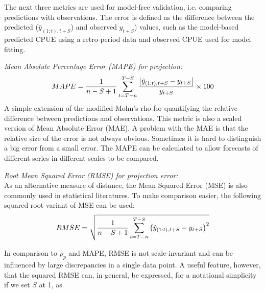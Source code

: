 
\vspace{0.2cm} 
The next three metrics are used for model-free validation, i.e. comparing predictions with observations. The error is defined as the difference between the predicted ($\hat{y}_{(1:t),t+S}$) and observed $y_{t+S}$) values, such as the model-based predicted CPUE using a retro-period data and observed CPUE used for model fitting. 

\vspace{0.2cm} \noindent
{\it Mean Absolute Percentage Error (MAPE) for projection:}
\begin{equation}
\label{eqn:mape}
MAPE = \displaystyle \frac{1}{n-S+1} \sum_{t=T-n}^{T-S}
\frac{\left| \hat{y}_{(1:t),t+S}-y_{t+S} \right|}{y_{t+S}} \times 100 
\end{equation} 
A simple extension of the modified Mohn's rho for quantifying the relative difference between predictions and observations. This metric is also a scaled version of Mean Absolute Error (MAE). A problem with the MAE is that the relative size of the error is not always obvious. Sometimes it is hard to distinguish a big error from a small error. The MAPE can be calculated to allow forecasts of different series in different scales to be compared.

\vspace{0.2cm} \noindent
{\it Root Mean Squared Error (RMSE) for projection error:}\\
As an alternative measure of distance, the Mean Squared Error (MSE) is also commonly used in statistical literatures. To make comparison easier, the following squared root variant of MSE can be used: 
\begin{equation}
\label{eqn:rmse}
RMSE = \displaystyle \sqrt{ \frac{1}{n-S+1} \sum_{t=T-n}^{T-S} 
\left( \hat{y}_{(1:t),t+S}-y_{t+S} \right)^2 }
\end{equation} 

In comparison to $\rho_p$ and MAPE, RMSE is not scale-invariant and can be influenced by large discrepancies in a single data point. A useful feature, however, that the squared RMSE can, in general, be expressed,  for a notational simplicity if we set $S$ at 1, as

